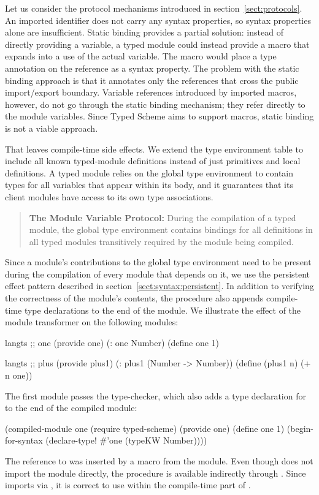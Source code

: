 \begin{schemeregion}
Let us consider the protocol mechanisms introduced in
section~\ref{sect:protocols}.
%
An imported identifier does not carry any syntax properties, so syntax
properties alone are insufficient.
%
Static binding provides a partial solution: instead of directly
providing a variable, a typed module could instead provide a macro
that expands into a use of the actual variable. The macro would place
a type annotation on the reference as a syntax property.
%
The problem with the static binding approach is that it annotates only
the references that cross the public import/export boundary.
Variable references introduced by imported macros, however, do not go
through the static binding mechanism; they refer directly to the
module variables.
%
Since Typed Scheme aims to support macros, static binding is not
a viable approach.

That leaves compile-time side effects. We extend the type environment
table to include all known typed-module definitions instead of just
primitives and local definitions. A typed module relies on the global
type environment to contain types for all variables that appear within
its body, and it guarantees that its client modules have access to its
own type associations.
\begin{quotation}\noindent
\textbf{The Module Variable Protocol:} 
During the compilation of a typed module, the global type environment
contains bindings for all definitions in all typed modules
transitively required by the module being compiled.
\end{quotation}

Since a module's contributions to the global type environment need to
be present during the compilation of every module that depends on it,
we use the persistent effect pattern described in
section~\ref{sect:syntax:persistent}. In addition to verifying the
correctness of the module's contents, the
 procedure also appends compile-time
type declarations to the end of the module.
%
We illustrate the effect of the module transformer on the following
modules:
\begin{schemedisplay}
langts ;; one
(provide one)
(: one Number)
(define one 1)

langts ;; plus
(provide plus1)
(: plus1 (Number -> Number))
(define (plus1 n)
  (+ n one))
\end{schemedisplay}
The first module passes the type-checker, which also adds a type
declaration for  to the end of the compiled module:
\begin{schemedisplay}
(compiled-module one
  (require typed-scheme)
  (provide one)
  (define one 1)
  (begin-for-syntax
    (declare-type! #'one (typeKW Number))))
\end{schemedisplay}
The reference to  was inserted by a macro from
the  module. Even though  does not
import the  module directly, the procedure is available
indirectly through . Since 
imports  via , it is correct to
use  within the compile-time part of
.


\end{schemeregion}

